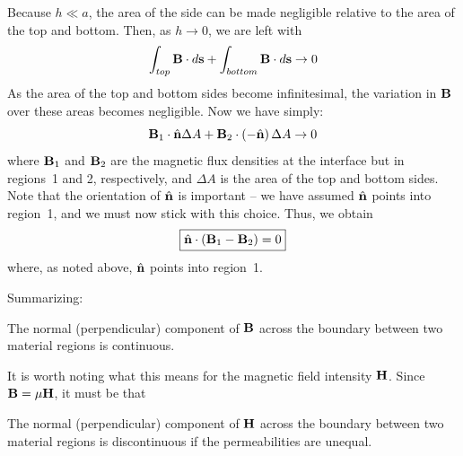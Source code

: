 Because $h\ll a$, the area of the side can be made negligible relative to the area of the top and bottom.
Then, as $h\to 0$, we are left with    
%
\begin{equation}
\int_{top} { {\bf B} \cdot d{\bf s} } + \int_{bottom} { {\bf B} \cdot d{\bf s} }  \to 0
\end{equation}
%
As the area of the top and bottom sides become infinitesimal, the variation in ${\bf B}$ over these areas becomes negligible.  Now we have simply:  
%
\begin{equation}
{\bf B}_1 \cdot \hat{\bf n}\Delta A + {\bf B}_2 \cdot \left( -\hat{\bf n} \right) \Delta A \to 0
\end{equation}
%
where ${\bf B}_1$ and ${\bf B}_2$ are the magnetic flux densities at the interface but in regions~1 and 2, respectively,
and $\Delta A$ is the area of the top and bottom sides.  
Note that the orientation of $\hat{\bf n}$ is important -- we have assumed $\hat{\bf n}$ points into region~1, and we must now stick with this choice.
Thus, we obtain 
%
\begin{equation}
\boxed{
\hat{\bf n} \cdot \left( {\bf B}_1 - {\bf B}_2 \right) = 0
}
\label{m0022_eBCB}
\end{equation}       
%
where, as noted above, $\hat{\bf n}$ points into region~1.

Summarizing:
%
\begin{mdframed}[backgroundcolor=yellow!20,nobreak=true] 
The normal (perpendicular) component of ${\bf B}$ across the boundary between two material regions is continuous.
\end{mdframed}

It is worth noting what this means for the magnetic field intensity ${\bf H}$. Since ${\bf B}=\mu{\bf H}$, it must be that
%
\begin{mdframed}[backgroundcolor=yellow!20,nobreak=true] 
The normal (perpendicular) component of ${\bf H}$ across the boundary between two material regions is discontinuous if the permeabilities are unequal.
\end{mdframed}




